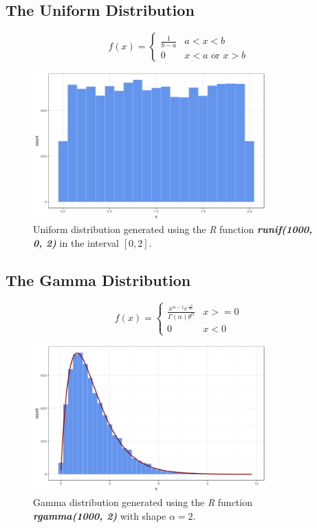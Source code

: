 \subsection{The Uniform Distribution}
\begin{equation}\label{eq:uniform_distribution}
  f(x) =
  \begin{cases}
    \frac{1}{b-a} & \text{$a < x < b$} \\
    0 & \text{$x < a$ or $x > b$}
  \end{cases}
\end{equation}

\begin{figure}[H]
    \centering
    \includegraphics[width=0.8\textwidth]{img/gld_clustering/extra_images/unif_0_2.png}
    \caption{Uniform distribution generated using the \textit{R} function \textbf{\textit{runif(1000, 0, 2)}} in the interval $[0, 2]$.}
    \label{fig:normal_sample}
\end{figure}

\subsection{The Gamma Distribution}
\begin{equation}\label{eq:gamma_distribution}
  f(x) =
  \begin{cases}
    \frac{x^{\alpha-1}e^{\frac{-x}{\theta}}}{\Gamma(\alpha)\theta^{\alpha}} & \text{$x >= 0 $} \\
    0 & \text{$x < 0$}
  \end{cases}
\end{equation}

\begin{figure}[H]
    \centering
    \includegraphics[width=0.8\textwidth]{img/gld_clustering/extra_images/gamma_2.png}
    \caption{Gamma distribution generated using the \textit{R} function \textbf{\textit{rgamma(1000, 2)}} with shape $\alpha = 2$.}
    \label{fig:normal_sample}
\end{figure}
